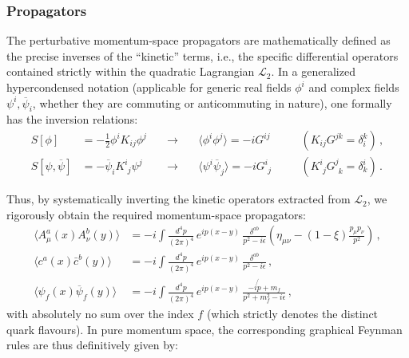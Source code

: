 \subsubsection{Propagators}

The perturbative momentum-space propagators are mathematically defined as the precise inverses of the ``kinetic'' terms, i.e., the specific differential operators contained strictly within the quadratic Lagrangian $\mathcal{L}_2$. In a generalized hypercondensed notation (applicable for generic real fields $\phi^i$ and complex fields $\psi^i, \overline{\psi}_i$, whether they are commuting or anticommuting in nature), one formally has the inversion relations:
\begin{equation} \label{eq:propagator_inversion}
    \begin{aligned}
        S[\phi]                  & = -\frac{1}{2}\phi^i K_{ij} \phi^j             & \quad \rightarrow \quad & \langle \phi^i \phi^j \rangle = -i G^{ij}                        & \quad & (K_{ij}G^{jk} = \delta_i^k)  \, ,                        \\
        S[\psi, \overline{\psi}] & = -\overline{\psi}_i K^i_{\phantom{i}j} \psi^j & \quad \rightarrow \quad & \langle \psi^i \overline{\psi}_j \rangle = -i G^i_{\phantom{i}j} & \quad & (K^i_{\phantom{i}j}G^j_{\phantom{j}k} = \delta^i_k) \, .
    \end{aligned}
\end{equation}

Thus, by systematically inverting the kinetic operators extracted from $\mathcal{L}_2$, we rigorously obtain the required momentum-space propagators:
\begin{equation} \label{eq:qcd_propagators}
    \begin{aligned}
        \langle A_\mu^a(x) A_\nu^b(y) \rangle          & = -i \int \frac{d^4p}{(2\pi)^4} \, e^{ip(x-y)} \, \frac{\delta^{ab}}{p^2 - i\epsilon} \left( \eta_{\mu\nu} - (1 - \xi)\frac{p_\mu p_\nu}{p^2} \right) \, , \\
        \langle c^a(x) \bar{c}^b(y) \rangle            & = -i \int \frac{d^4p}{(2\pi)^4} \, e^{ip(x-y)} \, \frac{\delta^{ab}}{p^2 - i\epsilon} \, ,                                                                 \\
        \langle \psi_f(x) \overline{\psi}_f(y) \rangle & = -i \int \frac{d^4p}{(2\pi)^4} \, e^{ip(x-y)} \, \frac{-i\not{p} + m_f}{p^2 + m_f^2 - i\epsilon} \, ,
    \end{aligned}
\end{equation}
with absolutely no sum over the index $f$ (which strictly denotes the distinct quark flavours). In pure momentum space, the corresponding graphical Feynman rules are thus definitively given by:


